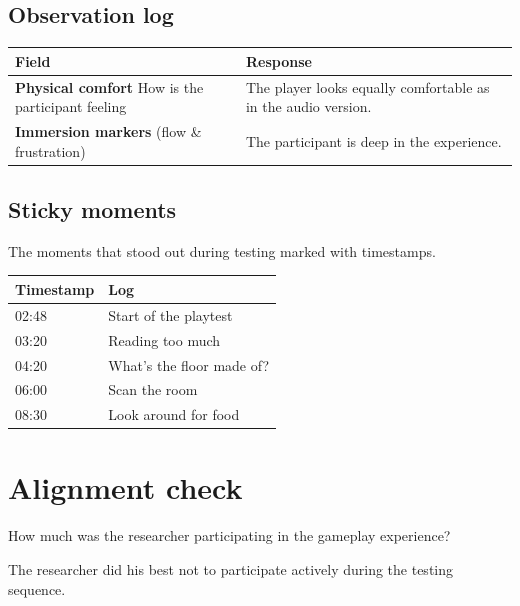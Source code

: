 \subsection{Observation log}
\begin{table}[h]
\centering
\begin{tabular}{|p{5cm}|p{10cm}|}
\hline
\textbf{Field} & \textbf{Response} \\ \hline
\textbf{Physical comfort} How is the participant feeling & The player looks equally comfortable as in the audio version.\\[1.5cm] \hline
\textbf{Immersion markers} (flow \& frustration) & The participant is deep in the experience.\\[1.5cm] \hline
\end{tabular}
\end{table}


\subsection{Sticky moments}
The moments that stood out during testing marked with timestamps.

\begin{table}[h]
\centering
\begin{tabular}{|p{3cm}|p{10cm}|}
\hline
\textbf{Timestamp} & \textbf{Log} \\ \hline
02:48 & Start of the playtest \\ \hline 
03:20 & Reading too much \\ \hline 
04:20 & What's the floor made of? \\ \hline 
06:00 & Scan the room \\ \hline 
08:30 & Look around for food \\ \hline 
\end{tabular}
\end{table}

\section{Alignment check}
How much was the researcher participating in the gameplay experience? 

The researcher did his best not to participate actively during the testing sequence. 



